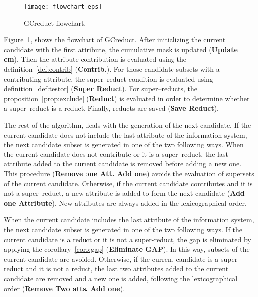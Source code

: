 \documentclass[authoryear,preprint,review,12pt]{elsarticle}
\begin{document}
	\begin{figure}[htb]
		\begin{center}
			\texttt{[image: flowchart.eps]}
		\end{center}
		\caption{GCreduct flowchart.}
		\label{fig:flowchart}
	\end{figure}
	
	Figure~\ref{fig:flowchart}, shows the flowchart of GCreduct. After initializing the current candidate with the first attribute, the cumulative mask is updated (\textbf{Update cm}). Then the attribute contribution is evaluated using the definition~\ref{def:contrib} (\textbf{Contrib.}). For those candidate subsets with a contributing attribute, the super--reduct condition is evaluated using definition~\ref{def:testor} (\textbf{Super Reduct}). For super--reducts, the proposition~\ref{prop:exclude} (\textbf{Reduct}) is evaluated in order to determine whether a super--reduct is a reduct. Finally, reducts are saved (\textbf{Save Reduct}). %
	
	The rest of the algorithm, deals with the generation of the next candidate. 
	If the current candidate does not include the last attribute of the information system, the next candidate subset is generated in one of the two following ways. When the current candidate does not contribute or it is a super--reduct, the last attribute added to the current candidate is removed before adding a new one. This procedure (\textbf{Remove one Att. Add one}) avoids the evaluation of supersets of the current candidate. Otherwise, if the current candidate contributes and it is not a super--reduct, a new attribute is added to form the next candidate (\textbf{Add one Attribute}). New attributes are always added in the lexicographical order. 
	
	When the current candidate includes the last attribute of the information system, the next candidate subset is generated in one of the two following ways. If the current candidate is a reduct or it is not a super-reduct, the gap is eliminated by applying the corollary~\ref{coro:gap} (\textbf{Eliminate GAP}). %
	In this way, subsets of the current candidate are avoided. Otherwise, if the current candidate is a super-reduct and it is not a reduct, the last two attributes added to the current candidate are removed and a new one is added, following the lexicographical order (\textbf{Remove Two atts. Add one}).
	
\end{document}

